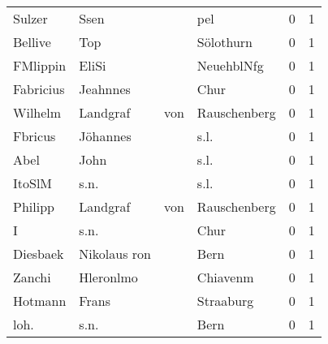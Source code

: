 \documentclass[10pt,a4paper,landscape]{article}
\begin{document}
\begin{longtable}{llllrr}
                   Sulzer &                               Ssen &             &                                         pel &          0 &         1 \\
                  Bellive &                                Top &             &                                   Sölothurn &          0 &         1 \\
                 FMlippin &                              EliSi &             &                                  NeuehblNfg &          0 &         1 \\
                Fabricius &                           Jeahnnes &             &                                        Chur &          0 &         1 \\
                  Wilhelm &                           Landgraf &         von &                                Rauschenberg &          0 &         1 \\
                  Fbricus &                           Jöhannes &             &                                        s.l. &          0 &         1 \\
                     Abel &                               John &             &                                        s.l. &          0 &         1 \\
                   ItoSlM &                               s.n. &             &                                        s.l. &          0 &         1 \\
                  Philipp &                           Landgraf &         von &                                Rauschenberg &          0 &         1 \\
                        I &                               s.n. &             &                                        Chur &          0 &         1 \\
                 Diesbaek &                       Nikolaus ron &             &                                        Bern &          0 &         1 \\
                   Zanchi &                          Hleronlmo &             &                                    Chiavenm &          0 &         1 \\
                  Hotmann &                              Frans &             &                                   Straaburg &          0 &         1 \\
                     loh. &                               s.n. &             &                                        Bern &          0 &         1 \\

\end{longtable}
\end{document}
